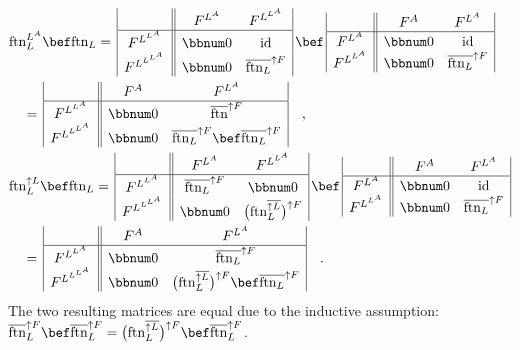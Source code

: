 \begin{align*}
 & \text{ftn}_{L}^{L^{A}}\bef\text{ftn}_{L}=\,\begin{array}{|c||cc|}
 & F^{L^{A}} & F^{L^{L^{A}}}\\
\hline F^{L^{L^{A}}} & \bbnum 0 & \text{id}\\
F^{L^{L^{L^{A}}}} & \bbnum 0 & \overline{\text{ftn}_{L}}^{\uparrow F}
\end{array}\,\bef\,\begin{array}{|c||cc|}
 & F^{A} & F^{L^{A}}\\
\hline F^{L^{A}} & \bbnum 0 & \text{id}\\
F^{L^{L^{A}}} & \bbnum 0 & \overline{\text{ftn}_{L}}^{\uparrow F}
\end{array}\\
 & \quad=\,\begin{array}{|c||cc|}
 & F^{A} & F^{L^{A}}\\
\hline F^{L^{L^{A}}} & \bbnum 0 & \overline{\text{ftn}}^{\uparrow F}\\
F^{L^{L^{L^{A}}}} & \bbnum 0 & \overline{\text{ftn}_{L}}^{\uparrow F}\bef\overline{\text{ftn}_{L}}^{\uparrow F}
\end{array}\quad,\\
 & \text{ftn}_{L}^{\uparrow L}\bef\text{ftn}_{L}=\,\begin{array}{|c||cc|}
 & F^{L^{A}} & F^{L^{L^{A}}}\\
\hline F^{L^{L^{A}}} & \overline{\text{ftn}_{L}}^{\uparrow F} & \bbnum 0\\
F^{L^{L^{L^{A}}}} & \bbnum 0 & \big(\text{ftn}_{L}^{\overline{\uparrow L}}\big)^{\uparrow F}
\end{array}\,\bef\,\begin{array}{|c||cc|}
 & F^{A} & F^{L^{A}}\\
\hline F^{L^{A}} & \bbnum 0 & \text{id}\\
F^{L^{L^{A}}} & \bbnum 0 & \overline{\text{ftn}_{L}}^{\uparrow F}
\end{array}\\
 & \quad=\,\begin{array}{|c||cc|}
 & F^{A} & F^{L^{A}}\\
\hline F^{L^{L^{A}}} & \bbnum 0 & \overline{\text{ftn}_{L}}^{\uparrow F}\\
F^{L^{L^{L^{A}}}} & \bbnum 0 & \big(\text{ftn}_{L}^{\overline{\uparrow L}}\big)^{\uparrow F}\bef\overline{\text{ftn}_{L}}^{\uparrow F}
\end{array}\quad.
\end{align*}
The two resulting matrices are equal due to the inductive assumption:
$\overline{\text{ftn}}_{L}^{\uparrow F}\bef\overline{\text{ftn}}_{L}^{\uparrow F}=\big(\text{ftn}_{L}^{\overline{\uparrow L}}\big)^{\uparrow F}\bef\overline{\text{ftn}}_{L}^{\uparrow F}$.

